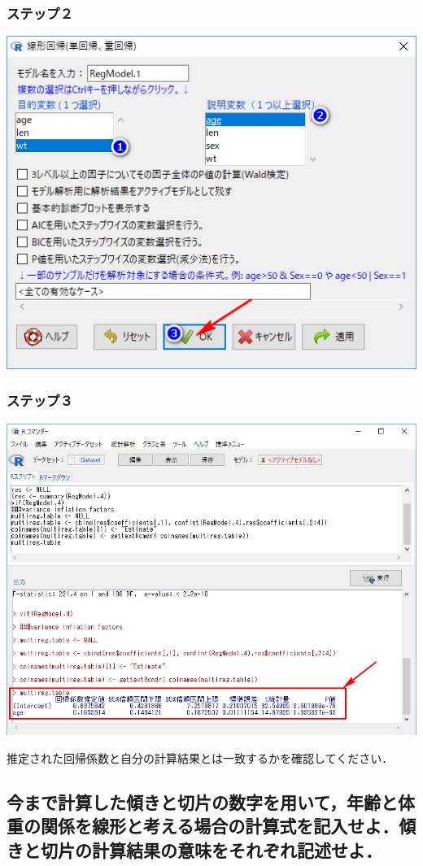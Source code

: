 \documentclass[11pt,]{problemset}
\begin{document}
\hypertarget{-6}{%
\subsubsection{ステップ２}\label{-6}}

\begin{center}\includegraphics[width=0.6\linewidth]{pic/lm01} \end{center}

\hypertarget{-7}{%
\subsubsection{ステップ３}\label{-7}}

\begin{center}\includegraphics[width=0.8\linewidth]{pic/lm02} \end{center}

推定された回帰係数と自分の計算結果とは一致するかを確認してください．

\subsection{今まで計算した傾きと切片の数字を用いて，年齢と体重の関係を線形と考える場合の計算式を記入せよ．傾きと切片の計算結果の意味をそれぞれ記述せよ．}
\end{document}
